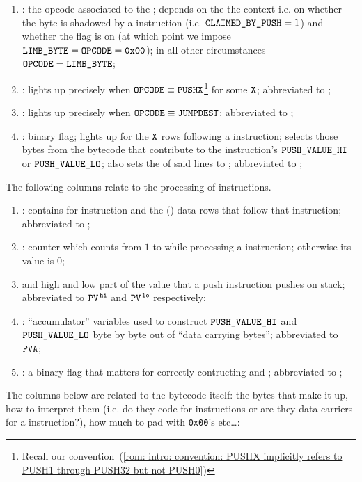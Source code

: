 \begin{enumerate}[resume]
    \item \romColumnOpcode{}:
	the opcode associated to the \romColumnLimbByte{};
	depends on the the context i.e. on whether the byte is shadowed by a  instruction (i.e. \( \texttt{CLAIMED\_BY\_PUSH}{} = 1 \)) and whether the \romColumnPadding{} flag is on (at which point we impose $\texttt{LIMB\_BYTE} = \texttt{OPCODE} = \texttt{0x00}$);
	in all other circumstances \( \texttt{OPCODE}{} = \texttt{LIMB\_BYTE}{} \);
    \item \romColumnOpcodeIsPush{}:
	lights up precisely when
	$\texttt{OPCODE} \equiv \texttt{PUSHX}$\footnote{Recall our convention~(\ref{rom: intro: convention: PUSHX implicitly refers to PUSH1 through PUSH32 but not PUSH0})}
	for some $\texttt{X}$;
	abbreviated to \ip{};
    \item \romColumnOpcodeIsJumpDest{}:
	lights up precisely when $\texttt{OPCODE} \equiv \texttt{JUMPDEST}$;
	abbreviated to \isValidJumpDestination{};
    \item \romColumnClaimedByPush{}:
	binary flag;
	lights up for the $\texttt{X}$ rows following a  instruction;
	selects those bytes from the bytecode that contribute to the  instruction's $\texttt{PUSH\_VALUE\_HI}$ or $\texttt{PUSH\_VALUE\_LO}$;
	also sets the \romColumnOpcode{} of said lines to ;
	abbreviated to \romColumnClaimedByPush{};
\end{enumerate}
The following columns relate to the processing of  instructions.
\begin{enumerate}[resume]
    \item \PP{}:
	contains  for  instruction and the () data rows that follow that instruction;
	abbreviated to \pp{};
    \item \CP{}:
	counter which counts from $1$ to \PP{} while processing a  instruction;
	otherwise its value is $0$;
    \item \romColumnPushValueHi{} and \romColumnPushValueLo{}
	high and low part of the value that a push instruction pushes on stack;
	abbreviated to $\texttt{PV}^{\mathtt{\,hi}}$ and $\texttt{PV}^{\mathtt{\,lo}}$ respectively;
    \item \PVA:
	``accumulator'' variables used to construct $\texttt{PUSH\_VALUE\_HI}$ and $\texttt{PUSH\_VALUE\_LO}$ byte by byte out of ``data carrying bytes'';
	abbreviated to $\texttt{PVA}$;
    \item \PFB{}:
	a binary flag that matters for correctly contructing \romColumnPushValueHi{} and \romColumnPushValueLo{};
	abbreviated to \pfb{};
\end{enumerate}
The columns below are related to the bytecode itself: the bytes that make it up, how to interpret them (i.e. do they code for instructions or are they data carriers for a  instruction?), how much to pad with \texttt{0x00}'s etc\dots:

